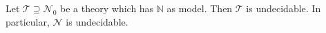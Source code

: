 Let $\mathcal{T} \supseteq \mathcal{N}_0$ be a theory which has $\mathbb{N}$ as model. Then $\mathcal{T}$ is undecidable. In particular, $\mathcal{N}$ is undecidable.
